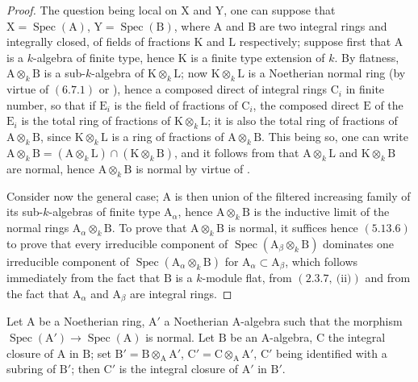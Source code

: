 \begin{proof}
The question being local on $\mathrm{X}$ and $\mathrm{Y}$, one can suppose that $\mathrm{X}=\operatorname{Spec}(\mathrm{A})$, $\mathrm{Y}=\operatorname{Spec}(\mathrm{B})$,
where $\mathrm{A}$ and $\mathrm{B}$ are two integral rings and integrally closed, of fields of fractions $\mathrm{K}$
and $\mathrm{L}$ respectively; suppose first that $\mathrm{A}$ is a $k$-algebra of finite type, hence $\mathrm{K}$
is a finite type extension of $k$. By flatness, $\mathrm{A}\otimes_k\mathrm{B}$ is a sub-$k$-algebra of $\mathrm{K}\otimes_k\mathrm{L}$;
now $\mathrm{K}\otimes_k\mathrm{L}$ is a Noetherian normal ring (by virtue of $(6.7.1)$ or ),
hence a composed direct of integral rings $\mathrm{C}_i$ in finite number, so that if $\mathrm{E}_i$ is the
field of fractions of $\mathrm{C}_i$, the composed direct $\mathrm{E}$ of the $\mathrm{E}_i$ is the total ring of fractions
of $\mathrm{K}\otimes_k\mathrm{L}$; it is also the total ring of fractions of $\mathrm{A}\otimes_k\mathrm{B}$, since $\mathrm{K}\otimes_k\mathrm{L}$
is a ring of fractions of $\mathrm{A}\otimes_k\mathrm{B}$. This being so, one can write $\mathrm{A}\otimes_k\mathrm{B}=(\mathrm{A}\otimes_k\mathrm{L})\cap(\mathrm{K}\otimes_k\mathrm{B})$,
and it follows from  that $\mathrm{A}\otimes_k\mathrm{L}$ and $\mathrm{K}\otimes_k\mathrm{B}$ are normal, hence $\mathrm{A}\otimes_k\mathrm{B}$ is normal
by virtue of .

Consider now the general case; $\mathrm{A}$ is then union of the filtered increasing
family of its sub-$k$-algebras of finite type $\mathrm{A}_\alpha$, hence $\mathrm{A}\otimes_k\mathrm{B}$ is the inductive limit of the
normal rings $\mathrm{A}_\alpha\otimes_k\mathrm{B}$. To prove that $\mathrm{A}\otimes_k\mathrm{B}$ is normal, it suffices hence $(5.13.6)$
to prove that every irreducible component of $\operatorname{Spec}(\mathrm{A}_\beta\otimes_k\mathrm{B})$ dominates one irreducible component
of $\operatorname{Spec}(\mathrm{A}_\alpha\otimes_k\mathrm{B})$ for $\mathrm{A}_\alpha\subset\mathrm{A}_\beta$, which follows immediately from the fact that $\mathrm{B}$ is
a $k$-module flat, from $(2.3.7,~\text{(ii)})$ and from the fact that $\mathrm{A}_\alpha$ and $\mathrm{A}_\beta$ are integral rings.
\end{proof}

\begin{proposition}[6.14.4]
\label{IV.6.14.4}
Let $\mathrm{A}$ be a Noetherian ring, $\mathrm{A}'$ a Noetherian $\mathrm{A}$-algebra
such that the morphism $\operatorname{Spec}(\mathrm{A}')\to\operatorname{Spec}(\mathrm{A})$ is normal. Let $\mathrm{B}$ be an $\mathrm{A}$-algebra, $\mathrm{C}$ the integral
closure of $\mathrm{A}$ in $\mathrm{B}$; set $\mathrm{B}'=\mathrm{B}\otimes_\mathrm{A}\mathrm{A}'$, $\mathrm{C}'=\mathrm{C}\otimes_\mathrm{A}\mathrm{A}'$, $\mathrm{C}'$ being identified with a subring
of $\mathrm{B}'$; then $\mathrm{C}'$ is the integral closure of $\mathrm{A}'$ in $\mathrm{B}'$.
\end{proposition}

